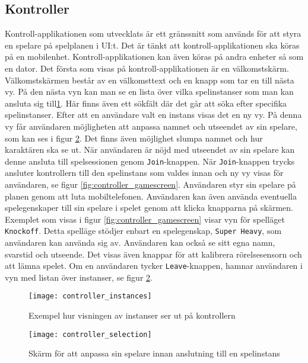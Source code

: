 \subsection{Kontroller}
Kontroll-applikationen som utvecklats är ett gränssnitt som används för att styra en spelare på spelplanen i UI:t. Det är tänkt att kontroll-applikationen ska köras på en mobilenhet. Kontroll-applikationen kan även köras på andra enheter så som en dator. Det första som visas på kontroll-applikationen är en välkomstskärm. Välkomstskärmen består av en välkomsttext och en knapp som tar en till nästa vy. På den nästa vyn kan man se en lista över vilka spelinstanser som man kan ansluta sig till\ref{fig:controller_instances}. Här finns även ett sökfält där det går att söka efter specifika spelinstanser. Efter att en användare valt en instans visas det en ny vy. På denna vy får användaren möjligheten att anpassa namnet och utseendet av sin spelare, som kan ses i figur \ref{fig:controller_selection}. Det finns även möjlighet slumpa namnet och hur karaktären ska se ut. När användaren är nöjd med utseendet av sin spelare kan denne ansluta till spelsessionen genom \texttt{Join}-knappen. När \texttt{Join}-knappen trycks ansluter kontrollern till den spelinstans som valdes innan och ny vy visas för användaren, se figur \ref{fig:controller_gamescreen}. Användaren styr sin spelare på planen genom att luta mobiltelefonen. Användaren kan även använda eventuella spelegenskaper till sin spelare i spelet genom att klicka knapparna på skärmen. Exemplet som visas i figur \ref{fig:controller_gamescreen} visar vyn för spelläget \texttt{Knockoff}. Detta spelläge stödjer enbart en spelegenskap, \texttt{Super Heavy}, som användaren kan använda sig av. Användaren kan också se sitt egna namn, svarstid och utseende. Det visas även knappar för att kalibrera rörelsesensorn och att lämna spelet. Om en användaren tycker \texttt{Leave}-knappen, hamnar användaren i vyn med listan över instanser, se figur \ref{fig:controller_selection}.

\begin{figure}[h]
    \centering
    \texttt{[image: controller\_instances]}
    \caption{Exempel hur visningen av instanser ser ut på kontrollern}
    \label{fig:controller_instances}
\end{figure}

\begin{figure}[h]
    \centering
    \texttt{[image: controller\_selection]}
    \caption{Skärm för att anpassa sin spelare innan anslutning till en spelinstans}
    \label{fig:controller_selection}
\end{figure}

